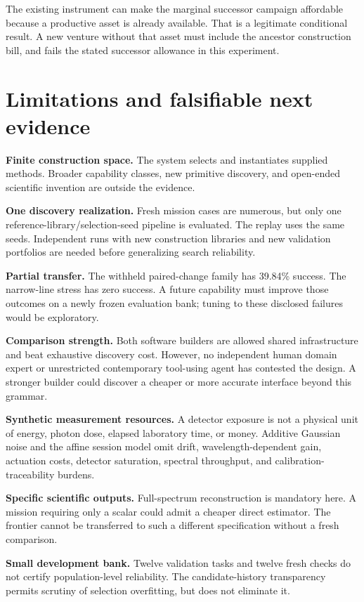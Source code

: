 \documentclass[11pt,a4paper]{article}
\begin{document}
The existing instrument can make the marginal successor campaign affordable because a productive asset is already available. That is a legitimate conditional result. A new venture without that asset must include the ancestor construction bill, and fails the stated successor allowance in this experiment.

\section{Limitations and falsifiable next evidence}

\textbf{Finite construction space.} The system selects and instantiates supplied methods. Broader capability classes, new primitive discovery, and open-ended scientific invention are outside the evidence.

\textbf{One discovery realization.} Fresh mission cases are numerous, but only one reference-library/selection-seed pipeline is evaluated. The replay uses the same seeds. Independent runs with new construction libraries and new validation portfolios are needed before generalizing search reliability.

\textbf{Partial transfer.} The withheld paired-change family has 39.84\% success. The narrow-line stress has zero success. A future capability must improve those outcomes on a newly frozen evaluation bank; tuning to these disclosed failures would be exploratory.

\textbf{Comparison strength.} Both software builders are allowed shared infrastructure and beat exhaustive discovery cost. However, no independent human domain expert or unrestricted contemporary tool-using agent has contested the design. A stronger builder could discover a cheaper or more accurate interface beyond this grammar.

\textbf{Synthetic measurement resources.} A detector exposure is not a physical unit of energy, photon dose, elapsed laboratory time, or money. Additive Gaussian noise and the affine session model omit drift, wavelength-dependent gain, actuation costs, detector saturation, spectral throughput, and calibration-traceability burdens.

\textbf{Specific scientific outputs.} Full-spectrum reconstruction is mandatory here. A mission requiring only a scalar could admit a cheaper direct estimator. The frontier cannot be transferred to such a different specification without a fresh comparison.

\textbf{Small development bank.} Twelve validation tasks and twelve fresh checks do not certify population-level reliability. The candidate-history transparency permits scrutiny of selection overfitting, but does not eliminate it.
\end{document}
